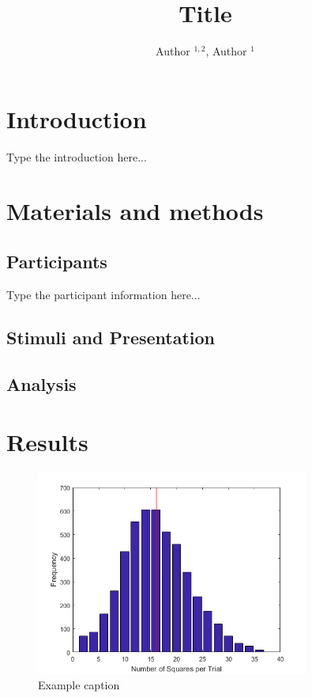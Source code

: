 \documentclass[a4paper,man,floatsintext,12pt]{apa6} %
\title{Title}
\author{Author $^{1,2}$, Author $^1$}
\affiliation{$^1$ Affiliation a, $^2$ Affiliation b}
\begin{document}
\maketitle
\linenumbers %


\section{Introduction}

Type the introduction here...

\section{Materials and methods} %

\subsection{Participants}

Type the participant information here...

\subsection{Stimuli and Presentation}
\subsection{Analysis}

\section{Results}


\begin{figure}[h!] %
	\centering	
	\includegraphics[width=0.8\textwidth]{exampleImage.png}
	\caption{Example caption}
	\label{fig:exampleImage}	
\end{figure} 
\end{document}
